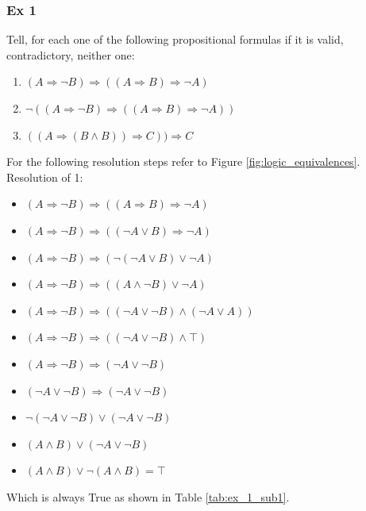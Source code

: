 \documentclass[10pt,a4paper]{article}
\begin{document}
\begin{itemize}
\subsubsection{Ex 1}
Tell, for each one of the following propositional formulas if it is valid, contradictory, neither one:
\begin{enumerate}
\item $(A\Rightarrow \neg B)\Rightarrow((A\Rightarrow B)\Rightarrow \neg A)$
\item $\neg ((A\Rightarrow \neg B)\Rightarrow ((A\Rightarrow B)\Rightarrow \neg A))$
\item $((A\Rightarrow (B\wedge B))\Rightarrow C))\Rightarrow C$
\end{enumerate}
For the following resolution steps refer to Figure \ref{fig:logic_equivalences}.\\
Resolution of 1:
\begin{itemize}
\item $(A\Rightarrow \neg B)\Rightarrow((A\Rightarrow B)\Rightarrow \neg A)$
\item $(A\Rightarrow \neg B)\Rightarrow((\neg A\vee B)\Rightarrow \neg A)$
\item $(A\Rightarrow \neg B)\Rightarrow(\neg (\neg A\vee B)\vee \neg A)$
\item $(A\Rightarrow \neg B)\Rightarrow((A \wedge \neg B)\vee \neg A)$
\item $(A\Rightarrow \neg B)\Rightarrow((\neg A \vee \neg B)\wedge (\neg A \vee A))$
\item $(A\Rightarrow \neg B)\Rightarrow((\neg A \vee \neg B)\wedge \top)$
\item $(A\Rightarrow \neg B)\Rightarrow(\neg A \vee \neg B)$
\item $(\neg A\vee \neg B)\Rightarrow(\neg A \vee \neg B)$
\item $\neg (\neg A\vee \neg B)\vee (\neg A \vee \neg B)$
\item $ ( A \wedge B) \vee (\neg A \vee \neg B)$
\item $ ( A \wedge B) \vee \neg ( A \wedge  B)=\top$
\end{itemize}
Which is always True as shown in Table \ref{tab:ex_1_sub1}.\\


\end{itemize}
\end{document}
